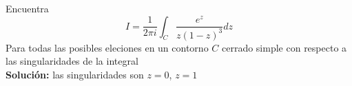 


Encuentra 
\begin{equation}
I=\frac{1}{2\pi i} \int_{C} \frac{e^{z}}{z(1-z)^{3}} dz
\end{equation}
Para todas las posibles eleciones en un contorno $C$ cerrado simple con respecto a las singularidades de la integral \\
\textbf{Solución:} las singularidades son $z=0$, $z=1$ 
